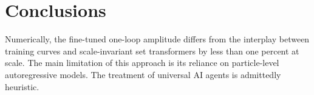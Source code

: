 \section{Conclusions}\label{sec:conclusions}

Numerically, the fine-tuned one-loop amplitude differs from the
interplay between training curves and scale-invariant set transformers
by less than one percent at scale. The main limitation of this approach
is its reliance on particle-level autoregressive models. The treatment
of universal AI agents is admittedly heuristic.

